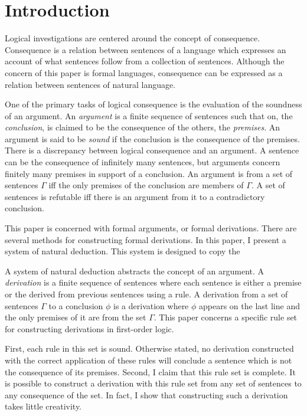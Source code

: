 \documentclass[12pt]{article}
\theoremstyle{definition}
\theoremstyle{remark}
\begin{document}
\maketitle

\section{Introduction}

Logical investigations are centered around the concept of consequence. Consequence is a relation between sentences of a language which expresses an account of what sentences follow from a collection of sentences\cite{restallbeall}. Although the concern of this paper is formal languages, consequence can be expressed as a relation between sentences of natural language.

One of the primary tasks of logical consequence is the evaluation of the soundness of an argument. An \textit{argument} is a finite sequence of sentences such that on, the \textit{conclusion}, is claimed to be the consequence of the others, the \textit{premises}. An argument is said to be \textit{sound} if the conclusion is the consequence of the premises. There is a discrepancy between logical consequence and an argument. A sentence can be the consequence of infinitely many sentences, but arguments concern finitely many premises in support of a conclusion. An argument is from a set of sentences $\Gamma$ iff the only premises of the conclusion are members of $\Gamma$. A set of sentences is refutable iff there is an argument from it to a contradictory conclusion.

This paper is concerned with formal arguments, or formal derivations. There are several methods for constructing formal derivations. In this paper, I present a system of natural deduction. This system is designed to copy the  

A system of natural deduction abstracts the concept of an argument. A \textit{derivation} is a finite sequence of sentences where each sentence is either a premise or the derived from previous sentences using a rule. A derivation from a set of sentences $\Gamma$ to a conclusion $\phi$ is a derivation where $\phi$ appears on the last line and the only premises of it are from the set $\Gamma$. This paper concerns a specific rule set for constructing derivations in first-order logic.

First, each rule in this set is sound. Otherwise stated, no derivation constructed with the correct application of these rules will conclude a sentence which is not the consequence of its premises. Second, I claim that this rule set is complete. It is possible to construct a derivation with this rule set from any set of sentences to any consequence of the set. In fact, I show that constructing such a derivation takes little creativity.
 
\end{document}
